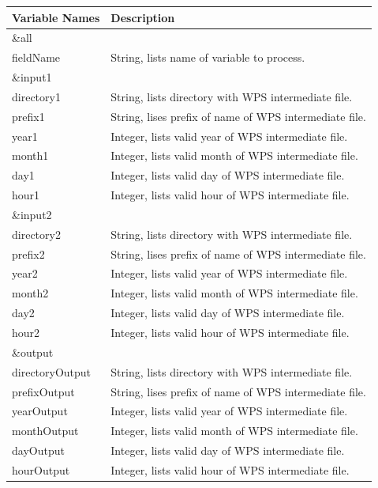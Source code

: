 \begin{tabular}{|l|l|} \hline
Variable Names & Description \\ \hline
\&all          & \\ \hline
fieldName & String, lists name of variable to process. \\ \hline
\&input1          & \\ \hline
directory1 & String, lists directory with WPS intermediate file. \\ \hline
prefix1 & String, lises prefix of name of WPS intermediate file. \\ \hline
year1 & Integer, lists valid year of WPS intermediate file. \\ \hline
month1 & Integer, lists valid month of WPS intermediate file. \\ \hline
day1 & Integer, lists valid day of WPS intermediate file. \\ \hline
hour1 & Integer, lists valid hour of WPS intermediate file. \\ \hline
\&input2          & \\ \hline
directory2 & String, lists directory with WPS intermediate file. \\ \hline
prefix2 & String, lises prefix of name of WPS intermediate file. \\ \hline
year2 & Integer, lists valid year of WPS intermediate file. \\ \hline
month2 & Integer, lists valid month of WPS intermediate file. \\ \hline
day2 & Integer, lists valid day of WPS intermediate file. \\ \hline
hour2 & Integer, lists valid hour of WPS intermediate file. \\ \hline
\&output          & \\ \hline
directoryOutput & String, lists directory with WPS intermediate file. \\ \hline
prefixOutput & String, lises prefix of name of WPS intermediate file. \\ \hline
yearOutput & Integer, lists valid year of WPS intermediate file. \\ \hline
monthOutput & Integer, lists valid month of WPS intermediate file. \\ \hline
dayOutput & Integer, lists valid day of WPS intermediate file. \\ \hline
hourOutput & Integer, lists valid hour of WPS intermediate file. \\ \hline
\end{tabular} \\

